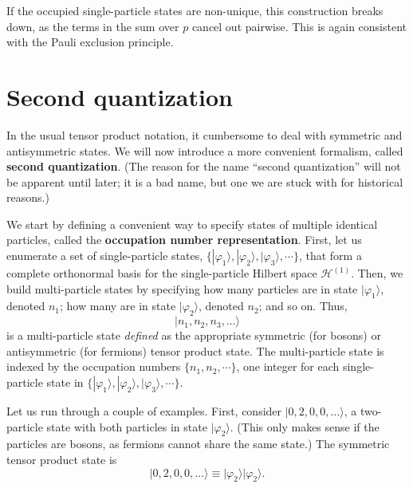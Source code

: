 \documentclass[pra,12pt]{revtex4}
\begin{document}
If the occupied single-particle states are non-unique, this
construction breaks down, as the terms in the sum over $p$ cancel out
pairwise.  This is again consistent with the Pauli exclusion
principle.

\section{Second quantization}

In the usual tensor product notation, it cumbersome to deal with
symmetric and antisymmetric states.  We will now introduce a more
convenient formalism, called \textbf{second quantization}.  (The
reason for the name ``second quantization'' will not be apparent until
later; it is a bad name, but one we are stuck with for historical
reasons.)

We start by defining a convenient way to specify states of multiple
identical particles, called the \textbf{occupation number
  representation}.  First, let us enumerate a set of single-particle
states, $\{|\varphi_1\rangle, |\varphi_2\rangle, |\varphi_3\rangle,
\cdots\}$, that form a complete orthonormal basis for the
single-particle Hilbert space $\mathscr{H}^{(1)}$.  Then, we build
multi-particle states by specifying how many particles are in state
$|\varphi_1\rangle$, denoted $n_1$; how many are in state
$|\varphi_2\rangle$, denoted $n_2$; and so on.  Thus,
\begin{equation*}
  |n_1,n_2,n_3,\dots\rangle
\end{equation*}
is a multi-particle state \textit{defined} as the appropriate
symmetric (for bosons) or antisymmetric (for fermions) tensor product
state.  The multi-particle state is indexed by the occupation numbers
$\{n_1,n_2,\cdots\}$, one integer for each single-particle state in
$\{|\varphi_1\rangle, |\varphi_2\rangle, |\varphi_3\rangle, \cdots\}$.

Let us run through a couple of examples.  First, consider
$|0,2,0,0,\dots\rangle$, a two-particle state with both particles in
state $|\varphi_2\rangle$.  (This only makes sense if the particles
are bosons, as fermions cannot share the same state.)  The symmetric
tensor product state is
\begin{equation}
  |0,2,0,0,\dots\rangle \equiv |\varphi_2\rangle|\varphi_2\rangle.
\end{equation}
\end{document}
